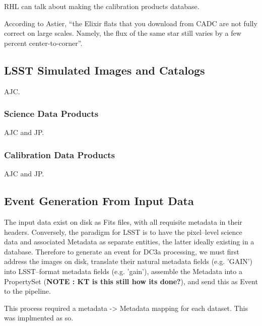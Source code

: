 RHL can talk about making the calibration products database.

According to Astier, ``the Elixir flats that you download from CADC
are not fully correct on large scales. Namely, the flux of the same
star still varies by a few percent center-to-corner''.

\subsection{LSST Simulated Images and Catalogs}

AJC.

\subsubsection{Science Data Products}

AJC and JP.

\subsubsection{Calibration Data Products}

AJC and JP.



\subsection{Event Generation From Input Data}

The input data exist on disk as Fits files, with all requisite
metadata in their headers.  Conversely, the paradigm for LSST is to
have the pixel--level science data and associated Metadata as separate
entities, the latter ideally existing in a database.  Therefore to
generate an event for DC3a processing, we must first address the
images on disk, translate their natural metadata fields (e.g. 'GAIN')
into LSST--format metadata fields (e.g. 'gain'), assemble the Metadata
into a PropertySet ({\bf NOTE : KT is this still how its done?}), and
send this as Event to the pipeline.

This process required a metadata -> Metadata mapping for each dataset.
This was implmented as so.

